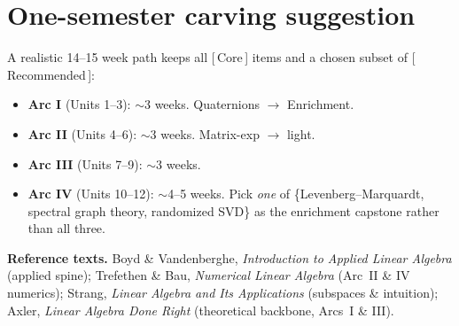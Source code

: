 \documentclass[11pt]{article}
\newcommand{\pri}[1]{{\footnotesize\sffamily\color{BrickRed}[\,#1\,]}}
\theoremstyle{definition}
\begin{document}
\section*{One-semester carving suggestion}
A realistic 14--15 week path keeps all \pri{Core} items and a chosen subset of
\pri{Recommended}:
\begin{itemize}[leftmargin=1.4em,itemsep=1pt]
  \item \textbf{Arc I} (Units 1--3): $\sim$3 weeks. Quaternions $\to$ Enrichment.
  \item \textbf{Arc II} (Units 4--6): $\sim$3 weeks. Matrix-exp $\to$ light.
  \item \textbf{Arc III} (Units 7--9): $\sim$3 weeks.
  \item \textbf{Arc IV} (Units 10--12): $\sim$4--5 weeks. Pick \emph{one} of
        \{Levenberg--Marquardt, spectral graph theory, randomized SVD\} as the
        enrichment capstone rather than all three.
\end{itemize}

\bigskip
\noindent\textbf{Reference texts.}
Boyd \& Vandenberghe, \emph{Introduction to Applied Linear Algebra} (applied
spine); Trefethen \& Bau, \emph{Numerical Linear Algebra} (Arc~II \& IV
numerics); Strang, \emph{Linear Algebra and Its Applications} (subspaces \&
intuition); Axler, \emph{Linear Algebra Done Right} (theoretical backbone,
Arcs~I \& III).
\end{document}
